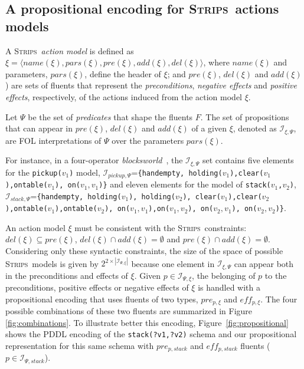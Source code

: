 \documentclass[letterpaper]{article} %
\newcommand{\tup}[1]{{\langle #1 \rangle}}
\newcommand{\strips}{\textsc{Strips}}     %
\begin{document}
\subsection{A propositional encoding for \strips\ actions models}
A \strips\ \emph{action model} is defined as $\xi=\tup{name(\xi),pars(\xi),pre(\xi),add(\xi),del(\xi)}$, where $name(\xi)$ and parameters, $pars(\xi)$, define the header of $\xi$; and $pre(\xi)$, $del(\xi)$ and $add(\xi)$) are sets of fluents that represent the {\em preconditions}, {\em negative effects} and {\em positive effects}, respectively, of the actions induced from the action model $\xi$.

Let $\Psi$ be the set of {\em predicates} that shape the fluents $F$. The set of propositions that can appear in $pre(\xi)$, $del(\xi)$ and $add(\xi)$ of a given $\xi$, denoted as ${\mathcal I}_{\xi,\Psi}$, are FOL interpretations of $\Psi$ over the parameters $pars(\xi)$.

For instance, in a four-operator {\em blocksworld}~\cite{slaney2001blocks}, the ${\mathcal I}_{\xi,\Psi}$ set contains five elements for the {\small \tt pickup($v_1$)} model, ${\mathcal I}_{pickup,\Psi}$={\small\tt\{handempty, holding($v_1$),clear($v_1$),ontable($v_1$), on($v_1,v_1$)\}} and eleven elements for the model of {\small \tt stack($v_1$,$v_2$)}, ${\mathcal I}_{stack,\Psi}$={\small\tt\{handempty, holding($v_1$), holding($v_2$), clear($v_1$),clear($v_2$),ontable($v_1$),ontable($v_2$), on($v_1,v_1$),on($v_1,v_2$), on($v_2,v_1$), on($v_2,v_2$)\}}. 

An action model $\xi$ must be consistent with the \strips\ constraints: $del(\xi)\subseteq pre(\xi)$, $del(\xi)\cap add(\xi)=\emptyset$ and $pre(\xi)\cap add(\xi)=\emptyset$. Considering only these syntactic constraints, the size of the space of possible \strips\ models is given by $2^{2\times|{\mathcal I}_{\Psi,\xi}|}$ because one element in $\mathcal{I}_{\xi,\Psi}$ can appear both in the preconditions and effects of $\xi$. Given $p \in \mathcal{I}_{\Psi,\xi}$, the belonging of $p$ to the preconditions, positive effects or negative effects of $\xi$ is handled with a propositional encoding that uses fluents of two types, $pre_{p,\xi}$ and $eff_{p,\xi}$. The four possible combinations of these two fluents are summarized in Figure \ref{fig:combinations}.  To illustrate better this encoding, Figure~\ref{fig:propositional} shows the PDDL encoding of the {\tt\small stack(?v1,?v2)} schema and our propositional representation for this same schema with $pre_{p,stack}$ and $eff_{p,stack}$ fluents ($p\in{\mathcal I}_{\Psi,stack}$).
\end{document}
